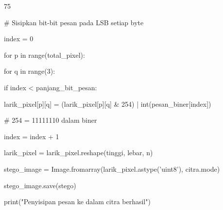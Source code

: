 \documentclass{article}
\begin{document}

75

\# Sisipkan bit-bit pesan pada LSB setiap byte      

index = 0       

for p in range(total\_pixel):         

   for q in range(3):                

      if index < panjang\_bit\_pesan:      

         larik\_pixel[p][q] = (larik\_pixel[p][q] \& 254) | int(pesan\_biner[index])   

             \# 254 = 11111110 dalam biner 

         index = index +  1        


larik\_pixel = larik\_pixel.reshape(tinggi, lebar, n)        

stego\_image = Image.fromarray(larik\_pixel.astype('uint8'), citra.mode)        

stego\_image.save(stego)       

print("Penyisipan pesan ke dalam citra berhasil")
\end{document}
